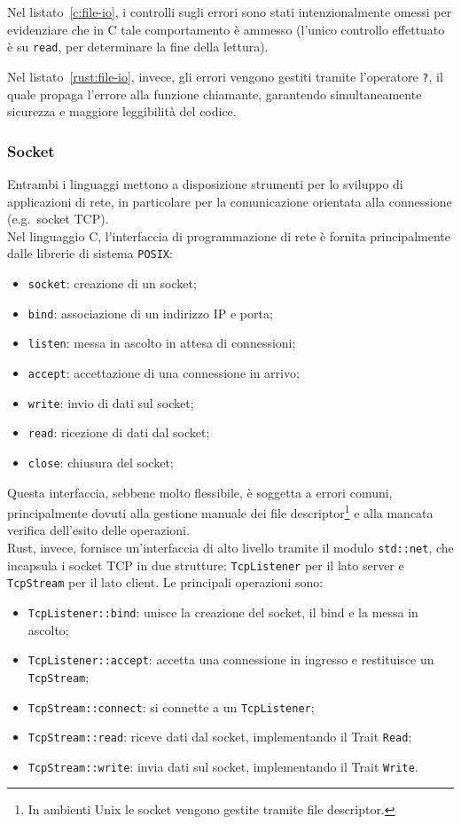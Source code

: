 Nel listato~\ref{c:file-io}, i controlli sugli errori sono stati intenzionalmente omessi per evidenziare che in C tale comportamento è ammesso (l'unico controllo effettuato è su \texttt{read}, per determinare la fine della lettura).

Nel listato~\ref{rust:file-io}, invece, gli errori vengono gestiti tramite l'operatore \texttt{?}, il quale propaga l'errore alla funzione chiamante, garantendo simultaneamente sicurezza e maggiore leggibilità del codice.

\subsubsection{Socket}
Entrambi i linguaggi mettono a disposizione strumenti per lo sviluppo di applicazioni di rete, in particolare per 
la comunicazione orientata alla connessione (e.g.\  socket TCP). \hfill
\vspace{8pt}\\
\noindent Nel linguaggio C, l'interfaccia di programmazione di rete è fornita principalmente dalle librerie di sistema \texttt{POSIX}:\ 
\begin{itemize}
    \item \texttt{socket}: creazione di un socket;
    \item \texttt{bind}: associazione di un indirizzo IP e porta;
    \item \texttt{listen}: messa in ascolto in attesa di connessioni;
    \item \texttt{accept}: accettazione di una connessione in arrivo;
    \item \texttt{write}: invio di dati sul socket;
    \item \texttt{read}: ricezione di dati dal socket;
    \item \texttt{close}: chiusura del socket;
\end{itemize}
Questa interfaccia, sebbene molto flessibile, è soggetta a errori comuni, principalmente dovuti alla gestione manuale dei file descriptor\footnote{In ambienti Unix le socket vengono gestite tramite file descriptor.} e alla mancata verifica dell'esito delle operazioni. \hfill
\vspace{8pt}\\
\noindent Rust, invece, fornisce un'interfaccia di alto livello tramite il modulo \texttt{std::net},
che incapsula i socket TCP in due strutture: \texttt{TcpListener} per il lato server e \texttt{TcpStream} per il lato client.
Le principali operazioni sono:
\begin{itemize}
    \item \texttt{TcpListener::bind}: unisce la creazione del socket, il bind e la messa in ascolto;
    \item \texttt{TcpListener::accept}: accetta una connessione in ingresso e restituisce un \texttt{TcpStream};
    \item \texttt{TcpStream::connect}: si connette a un \texttt{TcpListener};
    \item \texttt{TcpStream::read}: riceve dati dal socket, implementando il Trait \texttt{Read};
    \item \texttt{TcpStream::write}: invia dati sul socket, implementando il Trait \texttt{Write}.
\end{itemize}
